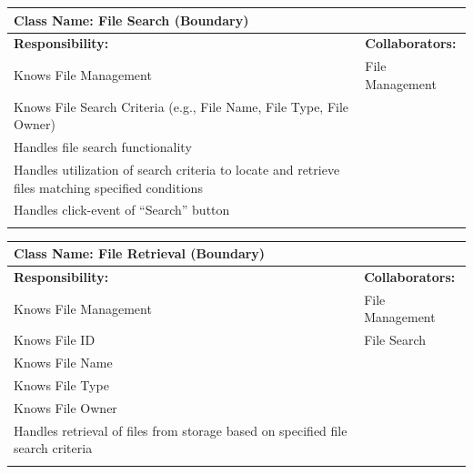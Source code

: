 \documentclass[]{article}
\begin{document}
\begin{itemize}
	\begin{table}[ht]
		\centering
		\begin{tabular}{|p{7cm}|p{7cm}|}
		\hline 
		 \multicolumn{2}{|l|}{\textbf{Class Name:} File Search (Boundary)} \\
		\hline
		\textbf{Responsibility:} & \textbf{Collaborators:} \\
		\hline
			Knows File Management & File Management\\
			Knows File Search Criteria (e.g., File Name, File Type, File Owner) &\\
			Handles file search functionality &\\
			Handles utilization of search criteria to locate and retrieve files matching specified conditions &\\
			Handles click-event of “Search” button &\\
		\vspace{0.1in} & \\
		\hline
		\end{tabular}
	\end{table}

	\begin{table}[ht]
		\centering
		\begin{tabular}{|p{7cm}|p{7cm}|}
		\hline 
		 \multicolumn{2}{|l|}{\textbf{Class Name:} File Retrieval (Boundary)} \\
		\hline
		\textbf{Responsibility:} & \textbf{Collaborators:} \\
		\hline
			Knows File Management & File Management \\
			Knows File ID & File Search \\
			Knows File Name &\\
			Knows File Type &\\
			Knows File Owner &\\
			Handles retrieval of files from storage based on specified file search criteria &\\
		\vspace{0.1in} & \\
		\hline
		\end{tabular}
	\end{table}


\end{itemize}
\end{document}
